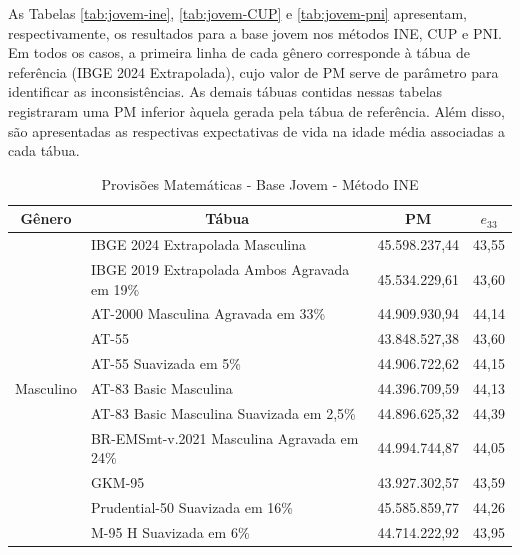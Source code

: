 As Tabelas \ref{tab:jovem-ine}, \ref{tab:jovem-CUP} e \ref{tab:jovem-pni} apresentam, respectivamente, os resultados para a base jovem nos métodos INE, CUP e PNI. Em todos os casos, a primeira linha de cada gênero corresponde à tábua de referência (IBGE 2024 Extrapolada), cujo valor de PM serve de parâmetro para identificar as inconsistências. As demais tábuas contidas nessas tabelas registraram uma PM inferior àquela gerada pela tábua de referência. Além disso, são apresentadas as respectivas expectativas de vida na idade média associadas a cada tábua.
\vspace{0.25cm}
\begin{table}[htbp]
    \centering
    \caption{Provisões Matemáticas - Base Jovem - Método INE}
    \begin{threeparttable}
    \renewcommand{\arraystretch}{1.0}
    \begin{tabular}{llrr}
    \toprule
    \multicolumn{1}{c}{\textbf{Gênero}} & \multicolumn{1}{c}{\textbf{Tábua}} & \multicolumn{1}{c}{\textbf{PM}} & \multicolumn{1}{c}{\textbf{$e_{33}$}} \\ \midrule
    \multirow{11}{*}{Masculino} & IBGE 2024 Extrapolada Masculina & 45.598.237,44	& 43,55 \\
                                & IBGE 2019 Extrapolada Ambos Agravada em 19\% & 45.534.229,61 & 43,60 \\
                                & AT-2000 Masculina Agravada em 33\% & 44.909.930,94 & 44,14 \\
                                & AT-55 & 43.848.527,38 & 43,60 \\
                                & AT-55 Suavizada em 5\% & 44.906.722,62 & 44,15 \\
                                & AT-83 Basic Masculina & 44.396.709,59 & 44,13 \\
                                & AT-83 Basic Masculina Suavizada em 2,5\% & 44.896.625,32 & 44,39 \\
                                & BR-EMSmt-v.2021 Masculina Agravada em 24\% & 44.994.744,87 & 44,05 \\
                                & GKM-95 & 43.927.302,57 & 43,59 \\
                                & Prudential-50 Suavizada em 16\% & 45.585.859,77 & 44,26 \\ 
                                & M-95 H Suavizada em 6\% & 44.714.222,92 & 43,95 \\ \hline

\end{tabular}
\end{threeparttable}
\end{table}
